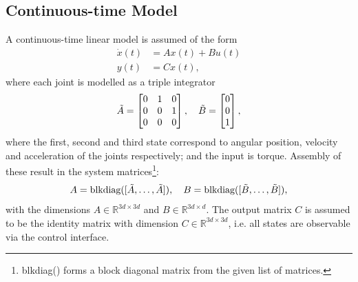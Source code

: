 \documentclass[final]{LTHtwocol} %
\begin{document}
\subsection{Continuous-time Model}
A continuous-time linear model is assumed of the form 
\begin{equation}
    \begin{split} 
        \dot{x}(t) & = Ax(t) + Bu(t) \\
        y(t) & = Cx(t),
    \end{split}
\end{equation}
where each joint is modelled as a triple integrator
\begin{equation}
    \Tilde{A} = \begin{bmatrix} 
        0 & 1 & 0 \\
        0 & 0 & 1 \\
        0 & 0 & 0
    \end{bmatrix}, \quad
    \Tilde{B} = \begin{bmatrix}
        0 \\ 0 \\ 1
    \end{bmatrix},
\end{equation}
where the first, second and third state correspond to angular position, velocity and acceleration of the joints respectively; and the input is torque. Assembly of these result in the system matrices\footnote{blkdiag() forms a block diagonal matrix from the given list of matrices.}:
\begin{equation}
    \label{eq:cont-time_model}
    A = \textrm{blkdiag}([\Tilde{A}, \dots, \Tilde{A}]), \quad
    B = \textrm{blkdiag}([\Tilde{B}, \dots, \Tilde{B}]),
\end{equation}
with the dimensions $A\in \mathbb{R}^{3d\times 3d}$ and $B\in \mathbb{R}^{3d\times d}$. The output matrix $C$ is assumed to be the identity matrix with dimension $C\in \mathbb{R}^{3d\times 3d}$, i.e. all states are observable via the control interface. 
\end{document}

